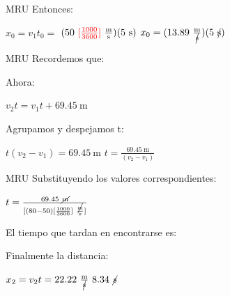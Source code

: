 \documentclass{beamer}
\begin{document}
\begin{frame}{MRU}
Entonces:
	
	\begin{center}
	{\huge
	\( x_0 = v_1t_{0}= \)
	\( (50~{\color{red} [\frac{1000}{3600}]}~\frac{\text{m}}{\text{s}})
        (5~\text{s}) \)
        \( x_0 =(13.89~\frac{\text{m}}{\cancel{\text{s}}})
        (5~\cancel{\text{s}}) \)

	}
	\end{center}
\end{frame}

\begin{frame}{MRU}
Recordemos que:

	
	Ahora:

	\begin{center}
	{\huge
	\( v_2t = v_1t + 69.45~\text{m}  \)
	}
        \end{center}

	Agrupamos y despejamos t:

	\begin{center}
        {\huge
        \( t(v_2-v_1)=69.45~\text{m} \)
	\( t=\frac{69.45~\text{m}}{(v_2-v_1)} \)
	}
	\end{center}
\end{frame}

\begin{frame}{MRU}
Substituyendo los valores correspondientes:

	\begin{center}
	{\huge
	\( t=\frac{69.45~\cancel{\text{m}}}{[(80-50) [\frac{1000}{3600}] 
	~\frac{\cancel{\text{m}}}{\text{s}}]}  \)
	}
        \end{center}


	El tiempo que tardan en encontrarse es:

	\begin{center}
        {\huge
        }
	\end{center}

        Finalmente la distancia:

        \begin{center}
        {\huge
        \( x_2 = v_2 t = 22.22
	~\frac{\text{m}}{\cancel{\text{s}}}
	~8.34~\cancel{s} \)}
        \end{center}

        \begin{center}
        {\huge
        }
        \end{center}
\end{frame}
\end{document}
